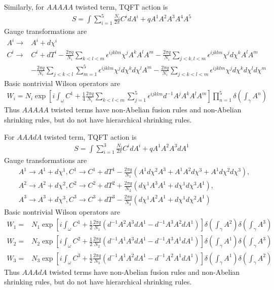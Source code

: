 \documentclass[11pt,nofootinbib,preprint]{revtex4-1}
\begin{document}
Similarly, for $AAAAA$ twisted term, TQFT action is
\begin{align}
	S=\int{\sum_{i=1}^5{\frac{N_i}{2\pi}C^idA^i+qA^1A^2A^3A^4A^5}}
\end{align}
Gauge transformations are 
\begin{align}
	A^i\rightarrow& A^i+d\chi ^i \nonumber
	\\
	C^i\rightarrow& C^i+dT^i-\frac{2\pi q}{N_i}\sum_{k<l<m}{\epsilon ^{ijklm}}\chi ^jA^kA^lA^m-\frac{2\pi q}{N_i}\sum_{j<k,l<m}{\epsilon ^{ijklm}}\chi ^jd\chi ^kA^lA^m \nonumber
	\\
	&-\frac{2\pi q}{N_i}\sum_{j<k<l}{\sum_{m=1}^5{\epsilon ^{ijklm}}}\chi ^jd\chi ^kd\chi ^lA^m-\frac{2\pi q}{N_i}\sum_{j<k<l<m}{\epsilon ^{ijklm}}\chi ^jd\chi ^kd\chi ^ld\chi ^m 
\end{align}
Basic nontrivial Wilson operators are
\begin{align}
	W_i=N_i\exp \left[ i\int_{\omega}{C^1+\frac{1}{4}\frac{2\pi q}{N_i}\sum_{k<l<m}{\sum_{j=1}^5{\epsilon ^{ijklm}}}d^{-1}A^jA^kA^lA^m} \right] \prod_{n=1}^5{\delta \left( \int_{\gamma}{A^n} \right)}
\end{align}
Thus $AAAAA$ twisted terms have non-Abelian fusion rules and non-Abelian shrinking rules, but do not have hierarchical shrinking rules.

For $AAAdA$ twisted term, TQFT action is
\begin{align}
	S=\int{\sum_{i=1}^3{\frac{N_i}{2\pi}}C^idA^i}+qA^1A^2A^3dA^1
\end{align}
Gauge transformations are
\begin{align}
	&A^1\rightarrow A^1+d\chi ^1,C^1\rightarrow C^1+dT^1-\frac{2\pi q}{N_1}\left( A^1d\chi ^2A^3+A^1A^2d\chi ^3+A^1d\chi ^2d\chi ^3 \right) ,\nonumber
	\\
	&A^2\rightarrow A^2+d\chi ^2,C^2\rightarrow C^2+dT^2+\frac{2\pi q}{N_2}\left( d\chi ^1A^3A^1+d\chi ^1d\chi ^3A^1 \right) ,\nonumber
	\\
	&A^3\rightarrow A^3+d\chi ^3,C^3\rightarrow C^3+dT^3-\frac{2\pi q}{N_3}\left( d\chi ^1A^2A^1+d\chi ^1d\chi ^2A^1 \right) 
\end{align}
Basic nontrivial Wilson operators are
\begin{align}
	W_1=&N_1\exp \left[ i\int_{\omega}{C^1+\frac{1}{2}\frac{2\pi q}{N_1}\left( d^{-1}A^2A^3dA^1-d^{-1}A^3A^2dA^1 \right)} \right] \delta \left( \int_{\gamma}{A^2} \right) \delta \left( \int_{\gamma}{A^3} \right) \nonumber
	\\
	W_2=&N_2\exp \left[ i\int_{\omega}{C^2+\frac{1}{2}\frac{2\pi q}{N_2}\left( d^{-1}A^1A^3dA^1-d^{-1}A^3A^1dA^1 \right)} \right] \delta \left( \int_{\gamma}{A^1} \right) \delta \left( \int_{\gamma}{A^3} \right) \nonumber
	\\
	W_3=&N_3\exp \left[ i\int_{\omega}{C^3+\frac{1}{2}\frac{2\pi q}{N_3}\left( d^{-1}A^1A^2dA^1-d^{-1}A^2A^1dA^1 \right)} \right] \delta \left( \int_{\gamma}{A^1} \right) \delta \left( \int_{\gamma}{A^2} \right) 
\end{align}
Thus $AAAdA$ twisted terms have non-Abelian fusion rules and non-Abelian shrinking rules, but do not have hierarchical shrinking rules.
\end{document}
